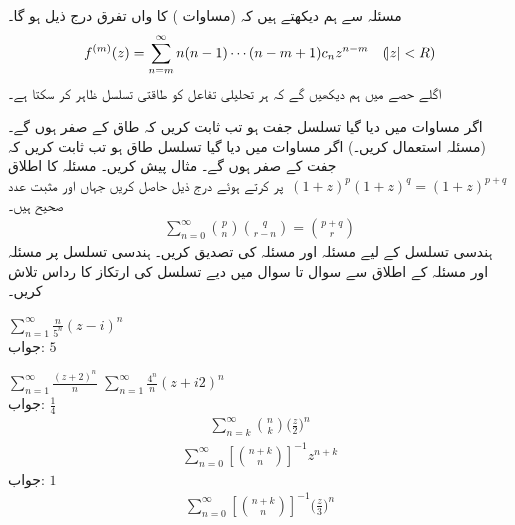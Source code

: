 مسئلہ   سے ہم دیکھتے ہیں کہ  (مساوات ) کا  واں تفرق  درج ذیل ہو گا۔
\begin{align}
f^{(m)}(z)=\sum\limits_{n=m}^{\infty} n(n-1)\cdots(n-m+1)c_nz^{n-m}\quad (\abs{z}<R)
\end{align}
اگلے حصے میں ہم دیکھیں گے کہ ہر تحلیلی تفاعل کو طاقتی تسلسل ظاہر کر سکتا ہے۔

\quad
اگر مساوات  میں دیا گیا تسلسل جفت ہو تب ثابت کریں کہ طاق  کے   صفر ہوں گے۔ (مسئلہ  استعمال کریں۔)
\quad
اگر مساوات  میں دیا گیا تسلسل طاق ہو تب ثابت کریں کہ جفت  کے   صفر ہوں گے۔ مثال پیش کریں۔
\quad
مسئلہ  کا اطلاق 
$\,(1+z)^p(1+z)^q=(1+z)^{p+q}\,$
پر کرتے ہوئے درج ذیل حاصل کریں جہاں  اور  مثبت عدد صحیح ہیں۔
\begin{align*}
\sum\limits_{n=0}^{\infty}
\binom{p}{n}\binom{q}{r-n}=\binom{p+q}{r}
\end{align*}
\quad 
ہندسی تسلسل کے لیے مسئلہ  اور مسئلہ  کی تصدیق کریں۔
ہندسی تسلسل پر مسئلہ  اور مسئلہ  کے اطلاق سے سوال  تا سوال  میں دیے تسلسل کی ارتکاز کا رداس تلاش کریں۔ 

\quad
$\sum\limits_{n=1}^{\infty}\tfrac{n}{5^n}(z-i)^n$\\
جواب:\quad
$5$

\quad
$\sum\limits_{n=1}^{\infty} \tfrac{(z+2)^n}{n}$
\quad
$\sum\limits_{n=1}^{\infty} \tfrac{4^n}{n}(z+i2)^n$\\
جواب:\quad
$\tfrac{1}{4}$
\quad
\begin{align*}
\sum\limits_{n=k}^{\infty}
\binom{n}{k}
\big(\frac{z}{2}\big)^n
\end{align*}
\quad
\begin{align*}
\sum\limits_{n=0}^{\infty}
\left[\binom{n+k}{n}\right]^{-1} z^{n+k}
\end{align*}
جواب:\quad 
$1$
\quad
\begin{align*}
\sum\limits_{n=0}^{\infty}
\left[\binom{ n+k}{n}\right]^{-1} \big(\frac{z}{3}\big)^n
\end{align*}


